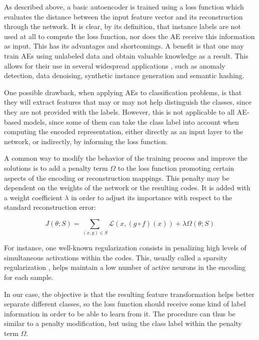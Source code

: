 As described above, a basic autoencoder is trained using a loss function which evaluates the distance between the input feature vector and its reconstruction through the network. It is clear, by its definition, that instance labels are not used at all to compute the loss function, nor does the AE receive this information as input. This has its advantages and shortcomings. A benefit is that one may train AEs using unlabeled data and obtain valuable knowledge as a result. This allows for their use in several widespread applications \cite{CHARTE202093}, such as anomaly detection, data denoising, synthetic instance generation and semantic hashing.

One possible drawback, when applying AEs to classification problems, is that they will extract features that may or may not help distinguish the classes, since they are not provided with the labels. However, this is not applicable to all AE-based models, since some of them can take the class label into account when computing the encoded representation, either directly as an input layer to the network, or indirectly, by informing the loss function.

A common way to modify the behavior of the training process and improve the solutions is to add a penalty term $\Omega$ to the loss function promoting certain aspects of the encoding or reconstruction mappings. This penalty may be dependent on the weights of the network or the resulting codes. It is added with a weight coefficient $\lambda$ in order to adjust its importance with respect to the standard reconstruction error:

\begin{equation}J\left(\theta;S\right)=\sum_{(x,y)\in S}\mathcal L\left(x,\left(g\circ f\right)\left(x\right)\right) + \lambda\Omega\left(\theta;S\right)\end{equation}

For instance, one well-known regularization consists in penalizing high levels of simultaneous activations within the codes. This, usually called a sparsity regularization \cite{ng2011sparse}, helps maintain a low number of active neurons in the encoding for each sample.

In our case, the objective is that the resulting feature transformation helps better separate different classes, so the loss function should receive some kind of label information in order to be able to learn from it. The procedure can thus be similar to a penalty modification, but using the class label within the penalty term $\Omega$.

